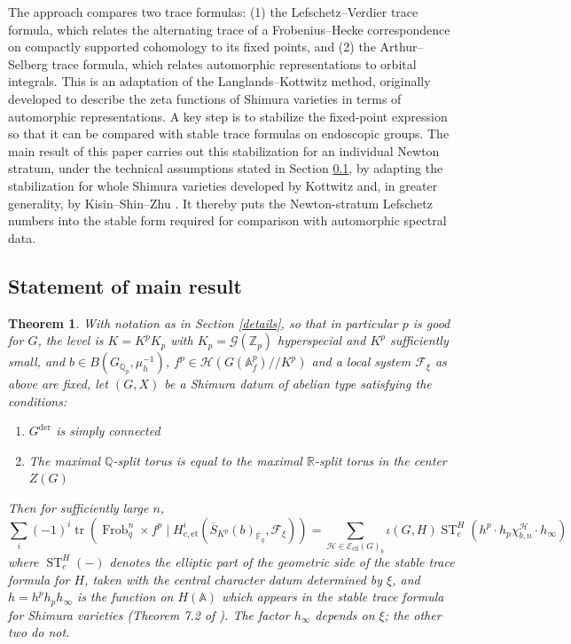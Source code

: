 \documentclass[11pt,a4paper]{article}
\newcommand{\Eell}{\mathcal{E}_{\mathrm{ell}}}
\theoremstyle{definition}
\theoremstyle{plain}
\theoremstyle{remark}
\theoremstyle{plain}
\newtheorem*{T}{Theorem}
\DeclareMathOperator{\Frob}{Frob}
\DeclareMathOperator{\tr}{tr}
\DeclareMathOperator{\ST}{ST}
\begin{document}
The approach compares two trace formulas: (1) the Lefschetz--Verdier trace formula, which relates the alternating trace of a Frobenius--Hecke correspondence on compactly supported cohomology to its fixed points, and (2) the Arthur--Selberg trace formula, which relates automorphic representations to orbital integrals. This is an adaptation of the Langlands--Kottwitz method, originally developed to describe the zeta functions of Shimura varieties in terms of automorphic representations. A key step is to stabilize the fixed-point expression so that it can be compared with stable trace formulas on endoscopic groups. The main result of this paper carries out this stabilization for an individual Newton stratum, under the technical assumptions stated in Section \ref{intro2}, by adapting the stabilization for whole Shimura varieties developed by Kottwitz \cite{MR1044820} and, in greater generality, by Kisin--Shin--Zhu \cite{kisin2021stabletraceformulashimura}. It thereby puts the Newton-stratum Lefschetz numbers into the stable form required for comparison with automorphic spectral data.

\subsection{Statement of main result}\label{intro2}
\begin{T}\label{maintheorem}
    With notation as in Section \ref{details}, so that in particular $p$ is good for $G$, the level is $K=K^pK_p$ with $K_p=\mathcal{G}(\mathbb{Z}_p)$ hyperspecial and $K^p$ sufficiently small, and $b\in B(G_{\mathbb{Q}_p},\mu_h^{-1})$, $f^p\in\mathcal{H}(G(\mathbb{A}_f^p)//K^p)$ and a local system $\mathcal{F}_{\xi}$ as above are fixed, let $(G,X)$ be a Shimura datum of abelian type satisfying the conditions:
    \begin{enumerate}
        \item $G^{\text{der}}$ is simply connected
        \item The maximal $\mathbb{Q}$-split torus is equal to the maximal $\mathbb{R}$-split torus in the center $Z(G)$
    \end{enumerate}
    Then for sufficiently large $n$,
    \begin{equation*}
		 \sum_i (-1)^i \tr(\Frob_q^n \times f^p \mid H^i_{c,\mathrm{et}}(\overline{S}_{K^p}(b)_{\overline{\mathbb{F}}_q}, \mathcal{F}_{\xi})) = \sum_{\mathcal{H} \in \Eell(G)_b} \iota (G,H) \ST_e^H(h^p \cdot h_p \chi_{b,n}^{\mathcal{H}} \cdot h_{\infty})
	\end{equation*}
    where $\ST_e^H(-)$ denotes the elliptic part of the geometric side of the stable trace formula for $H$, taken with the central character datum determined by $\xi$, and $h = h^p h_p h_{\infty}$ is the function on $H(\mathbb{A})$ which appears in the stable trace formula for Shimura varieties (Theorem 7.2 of \cite{MR1044820}). The factor $h_{\infty}$ depends on $\xi$; the other two do not.
\end{T}
\end{document}
